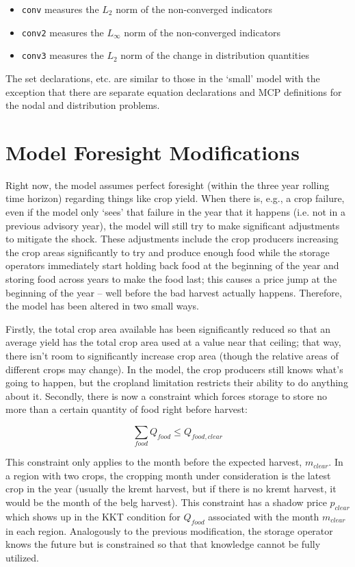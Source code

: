 \documentclass[letter,12pt]{article}
\begin{document}
\begin{itemize}
\item \verb!conv! measures the $L_2$ norm of the non-converged indicators
\item \verb!conv2! measures the $L_{\infty}$ norm of the non-converged indicators
\item \verb!conv3! measures the $L_2$ norm of the change in distribution quantities
\end{itemize}

The set declarations, etc. are similar to those in the `small' model with the exception that there are separate equation declarations and MCP definitions for the nodal and distribution problems.

\section{Model Foresight Modifications}

Right now, the model assumes perfect foresight (within the three year rolling time horizon) regarding things like crop yield.  When there is, e.g., a crop failure, even if the model only `sees' that failure in the year that it happens (i.e. not in a previous advisory year), the model will still try to make significant adjustments to mitigate the shock.  These adjustments include the crop producers increasing the crop areas significantly to try and produce enough food while the storage operators immediately start holding back food at the beginning of the year and storing food across years to make the food last; this causes a price jump at the beginning of the year -- well before the bad harvest actually happens.  Therefore, the model has been altered in two small ways.

Firstly, the total crop area available has been significantly reduced so that an average yield has the total crop area used at a value near that ceiling; that way, there isn't room to significantly increase crop area (though the relative areas of different crops may change).  In the model, the crop producers still knows what's going to happen, but the cropland limitation restricts their ability to do anything about it.  Secondly, there is now a constraint which forces storage to store no more than a certain quantity of food right before harvest:

\begin{equation}
\sum_{food} Q_{food} \leq Q_{food,clear}
\end{equation}

This constraint only applies to the month before the expected harvest, $m_{clear}$.  In a region with two crops, the cropping month under consideration is the latest crop in the year (usually the kremt harvest, but if there is no kremt harvest, it would be the month of the belg harvest).  This constraint has a shadow price $p_{clear}$  which shows up in the KKT condition for $Q_{food}$ associated with the month $m_{clear}$ in each region.  Analogously to the previous modification, the storage operator knows the future but is constrained so that that knowledge cannot be fully utilized. 

\end{document}
